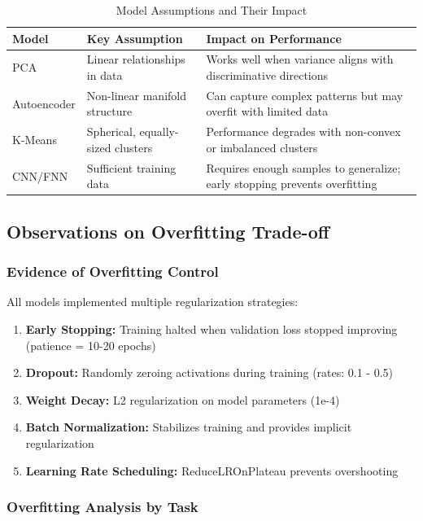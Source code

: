 \documentclass[11pt,a4paper]{article}
\begin{document}
\begin{table}[H]
\centering
\caption{Model Assumptions and Their Impact}
\begin{tabular}{@{}p{3cm}p{4cm}p{6cm}@{}}
\toprule
\textbf{Model} & \textbf{Key Assumption} & \textbf{Impact on Performance} \\
\midrule
PCA & Linear relationships in data & Works well when variance aligns with discriminative directions \\
\addlinespace
Autoencoder & Non-linear manifold structure & Can capture complex patterns but may overfit with limited data \\
\addlinespace
K-Means & Spherical, equally-sized clusters & Performance degrades with non-convex or imbalanced clusters \\
\addlinespace
CNN/FNN & Sufficient training data & Requires enough samples to generalize; early stopping prevents overfitting \\
\bottomrule
\end{tabular}
\end{table}

\subsection{Observations on Overfitting Trade-off}

\subsubsection{Evidence of Overfitting Control}

All models implemented multiple regularization strategies:

\begin{enumerate}
    \item \textbf{Early Stopping:} Training halted when validation loss stopped improving (patience = 10-20 epochs)
    \item \textbf{Dropout:} Randomly zeroing activations during training (rates: 0.1 - 0.5)
    \item \textbf{Weight Decay:} L2 regularization on model parameters (1e-4)
    \item \textbf{Batch Normalization:} Stabilizes training and provides implicit regularization
    \item \textbf{Learning Rate Scheduling:} ReduceLROnPlateau prevents overshooting
\end{enumerate}

\subsubsection{Overfitting Analysis by Task}
\end{document}
